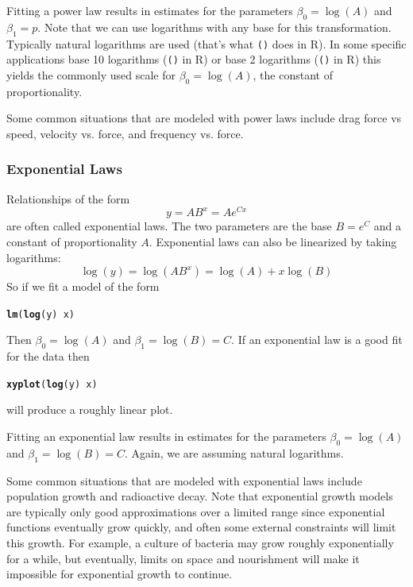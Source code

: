 \documentclass[twoside]{book}\usepackage[]{graphicx}\usepackage[]{xcolor}
\makeatletter
\newcommand{\hlopt}[1]{\textcolor[rgb]{0,0,0}{#1}}%
\newcommand{\hlstd}[1]{\textcolor[rgb]{0.345,0.345,0.345}{#1}}%
\newcommand{\hlkwd}[1]{\textcolor[rgb]{0.737,0.353,0.396}{\textbf{#1}}}%
\newenvironment{kframe}{%
 \def\at@end@of@kframe{}%
 \ifinner\ifhmode%
  \def\at@end@of@kframe{\end{minipage}}%
  \begin{minipage}{\columnwidth}%
 \fi\fi%
 \def\FrameCommand##1{\hskip\@totalleftmargin \hskip-\fboxsep
 \colorbox{shadecolor}{##1}\hskip-\fboxsep
     \hskip-\linewidth \hskip-\@totalleftmargin \hskip\columnwidth}%
 \MakeFramed {\advance\hsize-\width
   \@totalleftmargin\z@ \linewidth\hsize
   \@setminipage}}%
 {\par\unskip\endMakeFramed%
 \at@end@of@kframe}
\newenvironment{knitrout}{}{} %
\newcommand{\Rindex}[1]{\index{\texttt{#1}}}
\newcommand{\function}[1]{{\color{purple!75!blue}\texttt{\StrSubstitute{#1}{()}{}()}}\Rindex{#1}}
\def\R{{\sf R}}
\newcounter{example}[section]
\makeatother
\begin{document}
Fitting a power law results in estimates for the parameters $\beta_0 = \log(A)$ and $\beta_1 = p$.
Note that we can use logarithms with any base for this transformation.  Typically natural logarithms are used
(that's what \function{log()} does in \R).  
In some specific applications base 10 logarithms (\function{log10()} in \R) 
or base 2 logarithms (\function{log2()} in \R) 
this yields the commonly used scale for 
$\beta_0 = \log(A)$, the constant of proportionality.

Some common situations that are modeled with power laws include drag force vs speed, velocity vs. force, and
frequency vs. force.

\subsubsection{Exponential Laws}

Relationships of the form 
\[ y = A B^x = A e^{Cx} \]
are often called exponential laws.  
The two parameters are the base $B = e^C$ and a constant of proportionality $A$.
Exponential laws can also be linearized by taking logarithms:
\[ \log(y) = \log(A B^x) = \log(A) + x \log(B) \]
So if we fit a model of the form
\begin{knitrout}
\color{fgcolor}\begin{kframe}
\begin{alltt}
\hlkwd{lm}\hlstd{(}\hlkwd{log}\hlstd{(y)} \hlopt{~} \hlstd{x)}
\end{alltt}
\end{kframe}
\end{knitrout}
Then $\beta_0 = \log(A)$ and $\beta_1 = \log(B) = C$.  
If an exponential law is a good fit for the data then
\begin{knitrout}
\color{fgcolor}\begin{kframe}
\begin{alltt}
\hlkwd{xyplot}\hlstd{(}\hlkwd{log}\hlstd{(y)} \hlopt{~} \hlstd{x)}
\end{alltt}
\end{kframe}
\end{knitrout}
will produce a roughly linear plot.

Fitting an exponential law results in estimates for the parameters $\beta_0 = \log(A)$ and $\beta_1 = \log(B) = C$.
Again, we are assuming natural logarithms.

Some common situations that are modeled with exponential laws include
population growth and radioactive decay.  Note that exponential growth models
are typically only good approximations over a limited range since exponential
functions eventually grow quickly, and often some external constraints will
limit this growth.  For example, a culture of bacteria may grow roughly
exponentially for a while, but eventually, limits on space and nourishment will
make it impossible for exponential growth to continue.
\end{document}
